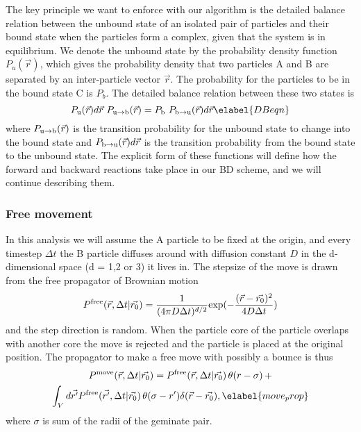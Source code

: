 The key principle we want to enforce with our algorithm is the detailed balance relation between the unbound state of an isolated pair of particles and their bound state when the particles form a complex, given that the system is in equilibrium. We denote the unbound state by the probability density function $P_u(\vec{r})$, which gives the probability density that two particles A and B are separated by an inter-particle vector $\vec{r}$. The probability for the particles to be in the bound state C is $P_b$. The detailed balance relation between these two states is
\begin{equation}
 P_{ \rm{u} }(\vec{r})d\vec{r} \,\, P_{ \rm{u} \rightarrow \rm{b} }(\vec{r}) = P_{ \rm{b} } \,\, P_{ \rm{b} \rightarrow \rm{u} }(\vec{r})d\vec{r}
\elabel{DBeqn}
\end{equation}
where $P_{ \rm{u} \rightarrow \rm{b} }(\vec{r})$ is the transition probability for the unbound state to change into the bound state and $P_{ \rm{b} \rightarrow \rm{u}}(\vec{r})d\vec{r}$ is the transition probability from the bound state to the unbound state. The explicit form of these functions will define how the forward and backward reactions take place in our BD scheme, and we will continue describing them. 

\subsubsection{Free movement}
In this analysis we will assume the A particle to be fixed at the origin, and every timestep $\Delta t$ the B particle diffuses around with diffusion constant $D$ in the d-dimensional space (d = 1,2 or 3) it lives in. The stepsize of the move is drawn from the free propagator of Brownian motion 
\begin{equation}
P^{\rm free}(\vec{r},\Delta t|\vec{r_0}) = \frac{1}{(4 \pi D \Delta t)^{d/2}}{\rm exp}(-\frac{(\vec{r}-\vec{r_0})^2}{4 D \Delta t}) 
\end{equation}
and the step direction is random. When the particle core of the particle overlaps with another core the move is rejected and the particle is placed at the original position. The propagator to make a free move with possibly a bounce is thus
\begin{multline}
 P^{\rm move}(\vec{r},\Delta t|\vec{r_0}) = P^{\rm free}(\vec{r},\Delta t|\vec{r_0}) \, \theta(r - \sigma) \, + \\ \int_{V} d\vec{r'}P^{\rm free}(\vec{r'},\Delta t|\vec{r_0}) \, \theta(\sigma - r')\delta(\vec{r}-\vec{r_0}),
\elabel{move_prop}
\end{multline}
where $\sigma$ is sum of the radii of the geminate pair. 

